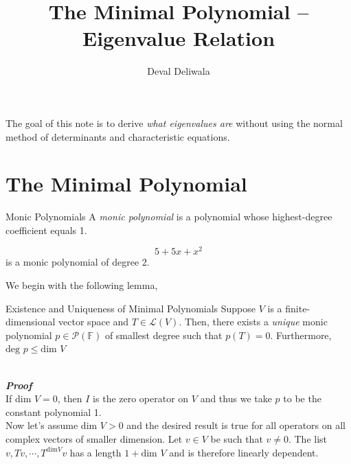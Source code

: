 \documentclass[svgnames]{article}     %
\title{The Minimal Polynomial -- Eigenvalue Relation}
\author{Deval Deliwala}
\begin{document}
\maketitle


The goal of this note is to derive \textit{what eigenvalues are} without using
the normal method of determinants and characteristic equations. 

\section{The Minimal Polynomial}

\begin{mainbox}{Monic Polynomials}
  A \textit{monic polynomial} is a polynomial whose highest-degree coefficient
  equals 1. 

  \[
  5 + 5x + x^2 
  \] \vspace{3px}
   is a monic polynomial of degree 2. 
  
\end{mainbox}

We begin with the following lemma, 

\begin{subbox}{Existence and Uniqueness of Minimal Polynomials} 
Suppose $V$ is a finite-dimensional vector space and $T \in \mathcal{L}(V)$.
Then, there exists a \textit{unique} monic polynomial $p \in
\mathcal{P}(\mathbb{F})$ of smallest degree such that $p(T) = 0$. Furthermore,
$\text{deg } p \leq \text{dim } V$
\end{subbox} \mbox{} \\

\textbf{\textit{Proof}} \\ 

If  dim $V = 0$, then $I$ is the zero operator on $V$ and thus we take $p$ to
be the constant polynomial 1. \\

Now let's assume dim $V > 0$ and the desired result is true for all operators
on all complex vectors of smaller dimension. Let $v \in V$ be such that $v \neq
0$. The list $v, Tv, \cdots, T^{\text{dim} V} v$ has a length $1 + \text{dim } V$ and
is therefore linearly dependent. \\
\end{document}
